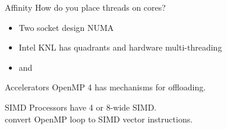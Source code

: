 
\begin{frame}[containsverbatim]{Affinity}
  How do you place threads on cores?
  \begin{itemize}
  \item Two socket design NUMA
  \item Intel KNL has quadrants and hardware multi-threading
  \item {} and 
  \end{itemize}
\end{frame}

\begin{frame}[containsverbatim]{Accelerators}
  OpenMP 4 has mechanisms for offloading.
\end{frame}

\begin{frame}[containsverbatim]{SIMD}
  Processors have 4 or 8-wide SIMD.\\
  convert OpenMP loop to SIMD vector instructions.
\end{frame}

\endinput

\begin{frame}[containsverbatim]{}
  \begin{itemize}
  \item 
  \end{itemize}
\end{frame}

